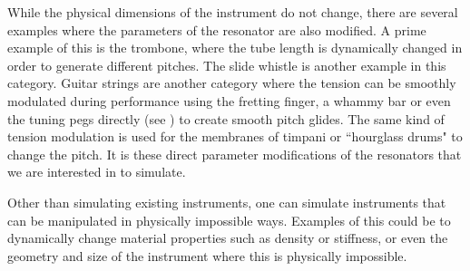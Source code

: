 While the physical dimensions of the instrument do not change, there are several examples where the parameters of the resonator are also modified. A prime example of this is the trombone, where the tube length is dynamically changed in order to generate different pitches. The slide whistle is another example in this category. Guitar strings are another category where the tension can be smoothly modulated during performance using the fretting finger, a whammy bar or even the tuning pegs directly (see \cite{Gomm2011}) to create smooth pitch glides. The same kind of tension modulation is used for the membranes of timpani or ``hourglass drums" to change the pitch. %
It is these direct parameter modifications of the resonators that we are interested in to simulate.



Other than simulating existing instruments, one can simulate instruments that can be manipulated in physically impossible ways. %
Examples of this could be to dynamically change material properties such as density or stiffness, or even the geometry and size of the instrument where this is physically impossible. %



